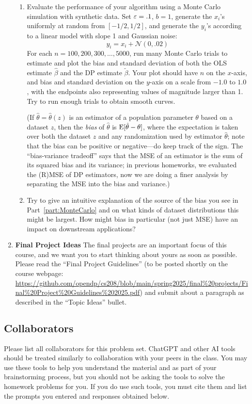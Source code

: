 \documentclass[11pt]{article}
\begin{document}
\begin{enumerate}[leftmargin=*]
\begin{enumerate}
    \item \label{part:MonteCarlo}
    Evaluate the performance of your
    algorithm using a Monte Carlo simulation with
    synthetic data.
    Set $\varepsilon=.1$, $b=1$, generate the $x_i$'s uniformly at random from $[-1/2,1/2]$,
    and generate the $y_i$'s 
    according to a linear model with slope 1 and Gaussian noise:
    $$y_i = x_i + \mathcal{N}(0,.02)$$
    For each $n=100,200,300,\ldots,5000$, run many Monte Carlo trials to estimate and plot the bias and standard deviation of both the OLS estimate $\hat{\beta}$ and the DP estimate $\tilde{\beta}$.  Your plot should have $n$ on the $x$-axis, and bias and standard deviation on the $y$-axis on a scale from $-1.0$ to $1.0$, with the endpoints also representing values of magnitude larger than 1.  Try to run enough trials to obtain smooth curves.
    
    (If $\hat{\theta}=\hat{\theta}(z)$ is an estimator of a  population parameter $\theta$ based on a dataset $z$, then the {\em bias} of $\hat{\theta}$ is $\mathrm{E}[\hat{\theta}-\theta]$, where the expectation is taken over both the dataset $z$ and any randomization used by estimator $\hat{\theta}$; note that the bias can be positive or negative---do keep track of the sign.  The ``bias-variance tradeoff'' says that the MSE of an estimator is the sum of its squared bias and its variance; in previous homeworks, we evaluated the (R)MSE of DP estimators, now we are doing a finer analysis by separating the MSE into the bias and variance.)
    
    \item Try to give an intuitive explanation of the source of the bias you see in 
    Part~\ref{part:MonteCarlo} and on what kinds of dataset distributions this might be largest.  How might bias in particular (not just MSE) have an impact on downstream applications?
\end{enumerate}
\item \textbf{Final Project Ideas} 
The final projects are an important focus of this course, and we want you to start thinking about yours as soon as possible.  Please read the
``Final Project Guidelines'' (to be posted shortly on the course webpage: \url{https://github.com/opendp/cs208/blob/main/spring2025/final%20projects/Final%20Project%20Guidelines%202025.pdf}) 
and submit about a paragraph as described in the ``Topic Ideas'' bullet.

\end{enumerate}

\subsection*{Collaborators}
Please list all collaborators for this problem set. ChatGPT and other AI tools should be treated similarly to collaboration with your peers in the 
class.  You may use these tools to help you understand the material and as part of your 
brainstorming process, but you should not be asking the tools to solve the homework problems 
for you. If you do use such tools, you must cite them and  list the 
prompts you entered and responses obtained below.
\end{document}
